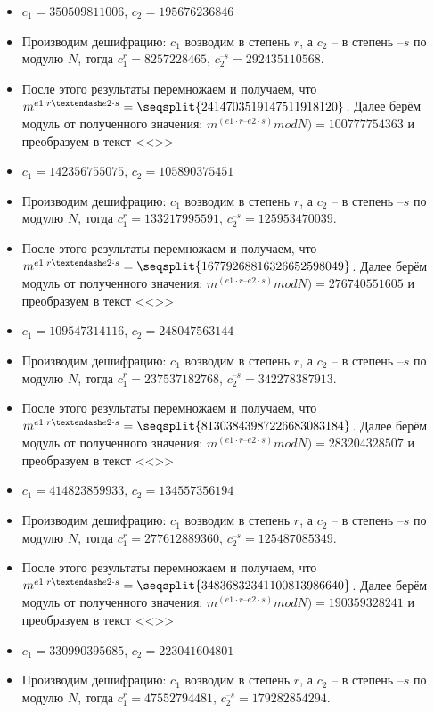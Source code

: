 \begin{itemize}
\item $c_1 = 350509811006$, $c_2=195676236846$
\item Производим дешифрацию: $c_1$ возводим в степень $r$, а $c_2$ – в степень $–s$ по модулю $N$, тогда $c_1 ^ r = 8257228465$, $c_2 ^{–s} = 292435110568$.
\item После этого результаты перемножаем и получаем, что $m ^ {e1 \cdot r – e2 \cdot s} = \seqsplit{2414703519147511918120}$. Далее берём модуль от полученного значения:  $m ^ {(e1 \cdot r – e2 \cdot s)} mod N) = 100777754363$ и преобразуем в текст <<>>
\item $c_1 = 142356755075$, $c_2=105890375451$
\item Производим дешифрацию: $c_1$ возводим в степень $r$, а $c_2$ – в степень $–s$ по модулю $N$, тогда $c_1 ^ r = 133217995591$, $c_2 ^{–s} = 125953470039$.
\item После этого результаты перемножаем и получаем, что $m ^ {e1 \cdot r – e2 \cdot s} = \seqsplit{16779268816326652598049}$. Далее берём модуль от полученного значения:  $m ^ {(e1 \cdot r – e2 \cdot s)} mod N) = 276740551605$ и преобразуем в текст <<>>
\item $c_1 = 109547314116$, $c_2=248047563144$
\item Производим дешифрацию: $c_1$ возводим в степень $r$, а $c_2$ – в степень $–s$ по модулю $N$, тогда $c_1 ^ r = 237537182768$, $c_2 ^{–s} = 342278387913$.
\item После этого результаты перемножаем и получаем, что $m ^ {e1 \cdot r – e2 \cdot s} = \seqsplit{81303843987226683083184}$. Далее берём модуль от полученного значения:  $m ^ {(e1 \cdot r – e2 \cdot s)} mod N) = 283204328507$ и преобразуем в текст <<>>
\item $c_1 = 414823859933$, $c_2=134557356194$
\item Производим дешифрацию: $c_1$ возводим в степень $r$, а $c_2$ – в степень $–s$ по модулю $N$, тогда $c_1 ^ r = 277612889360$, $c_2 ^{–s} = 125487085349$.
\item После этого результаты перемножаем и получаем, что $m ^ {e1 \cdot r – e2 \cdot s} = \seqsplit{34836832341100813986640}$. Далее берём модуль от полученного значения:  $m ^ {(e1 \cdot r – e2 \cdot s)} mod N) = 190359328241$ и преобразуем в текст <<>>
\item $c_1 = 330990395685$, $c_2=223041604801$
\item Производим дешифрацию: $c_1$ возводим в степень $r$, а $c_2$ – в степень $–s$ по модулю $N$, тогда $c_1 ^ r = 47552794481$, $c_2 ^{–s} = 179282854294$.

\end{itemize}
